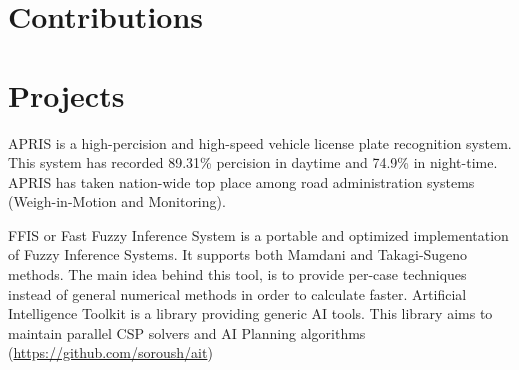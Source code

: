 \documentclass[11pt,a4paper,sans]{moderncv}        %
\begin{document}

\section{Contributions}
\section{Projects}
{APRIS is a high-percision and high-speed vehicle license plate recognition system. 
This system has recorded 89.31\% percision in daytime and 74.9\% in night-time. 
APRIS has taken nation-wide top place
among road administration systems (Weigh-in-Motion and Monitoring).}

{FFIS or Fast Fuzzy Inference System is a portable and optimized implementation of Fuzzy Inference Systems. 
It supports both Mamdani and Takagi-Sugeno methods. The main
idea behind this tool, is to provide per-case techniques instead of general numerical
methods in order to calculate faster.}
{Artificial Intelligence Toolkit is a library providing generic AI tools. This library aims to
maintain parallel CSP solvers and AI Planning algorithms 
(\hyperref[https://github.com/soroush/ait]{https://github.com/soroush/ait})}
\end{document}

